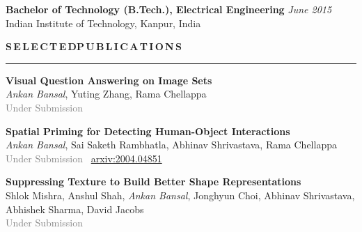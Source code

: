\documentclass[11pt, a4paper]{article}
\begin{document}
\vspace{3pt}

\textbf{Bachelor of Technology (B.Tech.), Electrical Engineering} \hfill  \textit{June 2015} \\
Indian Institute of Technology, Kanpur, India


\vspace{10pt}

%

\textbf{S\,E\,L\,E\,C\,T\,E\,D{\hspace{0.6em}}P\,U\,B\,L\,I\,C\,A\,T\,I\,O\,N\,S}
\vspace{5pt}
\hrule
\vspace{7pt}

\textbf{Visual Question Answering on Image Sets}\\
\textit{Ankan Bansal}, Yuting Zhang, Rama Chellappa\\
\textcolor{gray}{Under Submission}

\vspace{4pt}

\textbf{Spatial Priming for Detecting Human-Object Interactions}\\
\textit{Ankan Bansal}, Sai Saketh Rambhatla, Abhinav Shrivastava, Rama Chellappa\\
\textcolor{gray}{Under Submission} ~\href{https://arxiv.org/abs/2004.04851}{arxiv:2004.04851}

\vspace{4pt}

\textbf{Suppressing Texture to Build Better Shape Representations}\\
Shlok Mishra, Anshul Shah, \textit{Ankan Bansal}, Jonghyun Choi, Abhinav Shrivastava, Abhishek
Sharma, David Jacobs\\
\textcolor{gray}{Under Submission}
\end{document}
